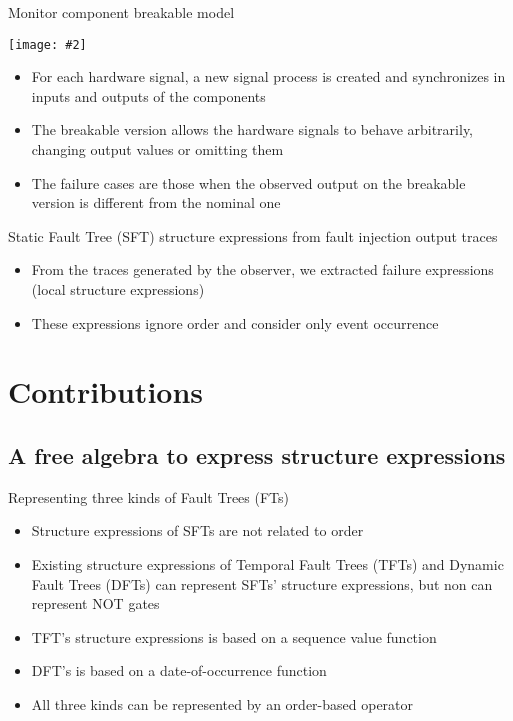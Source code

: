 \documentclass{beamer}
\def\FT{%
	Fault Tree (FT)%
	\gdef\FT{FT\xspace}%
	\gdef\FTs{FTs\xspace}%
	\gdef\IFT{An FT\xspace}%
	\xspace%
}
\def\FTs{%
	Fault Trees (FTs)%
	\gdef\FT{FT\xspace}%
	\gdef\FTs{FTs\xspace}%
	\gdef\IFT{An FT\xspace}%
	\xspace%
}
\def\IFT{%
	A Fault Tree (FT)%
	\gdef\FT{FT\xspace}%
	\gdef\FTs{FTs\xspace}%
	\gdef\IFT{An FT\xspace}%
	\xspace%
}
\def\SFT{%
	Static Fault Tree (SFT)%
	\gdef\SFT{SFT\xspace}%
	\gdef\SFTs{SFTs\xspace}%
	\xspace%
}
\def\SFTs{%
	Static Fault Trees (SFTs)%
	\gdef\SFT{SFT\xspace}%
	\gdef\SFTs{SFTs\xspace}%
	\xspace%
}
\def\TFT{%
	Temporal Fault Tree (TFT)%
	\gdef\TFT{TFT\xspace}%
	\gdef\TFTs{TFTs\xspace}%
	\xspace%
}
\def\TFTs{%
	Temporal Fault Trees (TFTs)%
	\gdef\TFT{TFT\xspace}%
	\gdef\TFTs{TFTs\xspace}%
	\xspace%
}
\def\DFT{%
	Dynamic Fault Tree (DFT)%
	\gdef\DFT{DFT\xspace}%
	\gdef\DFTs{DFTs\xspace}%
	\xspace%
}
\def\DFTs{%
	Dynamic Fault Trees (DFTs)%
	\gdef\DFT{DFT\xspace}%
	\gdef\DFTs{DFTs\xspace}%
	\xspace%
}
\newcommand{\includegraphicsaspectratio}[2][1]{%
  \texttt{[image: \#2]}%
}
\begin{document}
\begin{frame}[fragile]{Monitor component breakable model}
	\footnotesize
	\begin{center}
		\includegraphicsaspectratio[0.60]{monitor-breakable}
	\end{center}
	\begin{itemize}
		\item For each hardware signal, a new signal process is created and synchronizes in inputs and outputs of the components
		\item The breakable version allows the hardware signals to behave arbitrarily, changing output values or omitting them
		\item The failure cases are those when the observed output on the breakable version is different from the nominal one
	\end{itemize}
\end{frame}

\begin{frame}{\SFT structure expressions from fault injection output traces}
	\begin{itemize}
		\item From the traces generated by the observer, we extracted failure expressions (local structure expressions)
		\item These expressions ignore order and consider only event occurrence
	\end{itemize}
\end{frame}

\section{Contributions}
\subsection{A free algebra to express structure expressions}

\begin{frame}{Representing three kinds of \FTs}
	\begin{itemize}
		\item Structure expressions of \SFTs are not related to order
		\item Existing structure expressions of \TFTs and \DFTs can represent \SFTs' structure expressions, but non can represent NOT gates
		\item \TFT's structure expressions is based on a sequence value function
		\item \DFT's is based on a date-of-occurrence function
		\item All three kinds can be represented by an order-based operator
	\end{itemize}
\end{frame}
\end{document}
